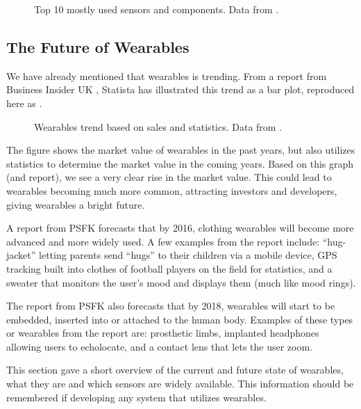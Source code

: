\begin{figure}[!htb]
    \centering
    
    \caption{Top 10 mostly used sensors and components. Data from \protect\cite{LISTOFWEARABLES}.}
    \label{fig:wearables-sensors}
\end{figure}

\subsection{The Future of Wearables}
We have already mentioned that wearables is trending. 
From a report from Business Insider UK \cite{WEARABLESTREND}, 
Statista \cite{WEARABLESTRENDNUMBERS} has illustrated this trend as a bar plot, 
reproduced here as .

\begin{figure}[!htb]
  \centering
  
  \caption{Wearables trend based on sales and statistics. Data from \protect\cite{WEARABLESTRENDNUMBERS}.}
  \label{fig:wearables-trend}
\end{figure}

The figure shows the market value of wearables in the past years, 
but also utilizes statistics to determine the market value in the coming years. 
Based on this graph (and report), 
we see a very clear rise in the market value. 
This could lead to wearables becoming much more common,
attracting investors and developers, 
giving wearables a bright future. 

A report from PSFK \cite{PFSK} forecasts that by 2016, 
clothing wearables will become more advanced and more widely used. 
A few examples from the report include: 
``hug-jacket'' letting parents send ``hugs'' to their children via a mobile device, 
GPS tracking built into clothes of football players on the field for statistics, 
and a sweater that monitors the user's mood and displays them (much like mood rings).

The report from PSFK also forecasts that by 2018, 
wearables will start to be embedded, \ie inserted into or attached to the human body. 
Examples of these types or wearables from the report are: 
prosthetic limbs, implanted headphones allowing users to echolocate, 
and a contact lens that lets the user zoom.

This section gave a short overview of the current and future state of wearables, 
what they are and which sensors are widely available. 
This information should be remembered if developing any system that utilizes wearables. 
